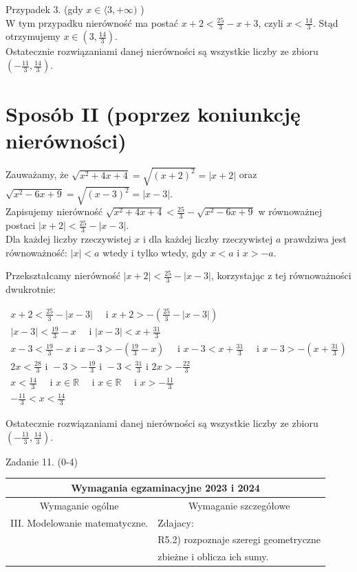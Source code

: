 \documentclass[10pt]{article}
\begin{document}
Przypadek 3. (gdy $x \in\langle 3,+\infty)$ )\\
W tym przypadku nierówność ma postać $x+2<\frac{25}{3}-x+3$, czyli $x<\frac{14}{3}$. Stąd otrzymujemy $x \in\left(3, \frac{14}{3}\right)$.\\
Ostatecznie rozwiązaniami danej nierówności są wszystkie liczby ze zbioru $\left(-\frac{11}{3}, \frac{14}{3}\right)$.

\section*{Sposób II (poprzez koniunkcję nierówności)}
Zauważamy, że $\sqrt{x^{2}+4 x+4}=\sqrt{(x+2)^{2}}=|x+2|$ oraz $\sqrt{x^{2}-6 x+9}=\sqrt{(x-3)^{2}}=|x-3|$.\\
Zapisujemy nierówność $\sqrt{x^{2}+4 x+4}<\frac{25}{3}-\sqrt{x^{2}-6 x+9}$ w równoważnej postaci $|x+2|<\frac{25}{3}-|x-3|$.\\
Dla każdej liczby rzeczywistej $x$ i dla każdej liczby rzeczywistej $a$ prawdziwa jest równoważność: $|x|<a$ wtedy i tylko wtedy, gdy $x<a$ i $x>-a$.

Przekształcamy nierówność $|x+2|<\frac{25}{3}-|x-3|$, korzystając z tej równoważności dwukrotnie:

$$
\begin{gathered}
x+2<\frac{25}{3}-|x-3| \quad \text { i } x+2>-\left(\frac{25}{3}-|x-3|\right) \\
|x-3|<\frac{19}{3}-x \quad \text { i }|x-3|<x+\frac{31}{3} \\
x-3<\frac{19}{3}-x \text { i } x-3>-\left(\frac{19}{3}-x\right) \quad \text { i } x-3<x+\frac{31}{3} \quad \text { i } x-3>-\left(x+\frac{31}{3}\right) \\
2 x<\frac{28}{3} \text { i }-3>-\frac{19}{3} \text { i }-3<\frac{31}{3} \text { i } 2 x>-\frac{22}{3} \\
x<\frac{14}{3} \quad \text { i } x \in \mathbb{R} \quad \text { i } x \in \mathbb{R} \quad \text { i } x>-\frac{11}{3} \\
-\frac{11}{3}<x<\frac{14}{3}
\end{gathered}
$$

Ostatecznie rozwiązaniami danej nierówności są wszystkie liczby ze zbioru $\left(-\frac{11}{3}, \frac{14}{3}\right)$.

Zadanie 11. (0-4)

\begin{center}
\begin{tabular}{|l|l|}
\hline
\multicolumn{2}{|c|}{Wymagania egzaminacyjne 2023 i 2024} \\
\hline
\multicolumn{1}{|c|}{Wymaganie ogólne} & \multicolumn{1}{c|}{Wymaganie szczegółowe} \\
\hline
III. Modelowanie matematyczne. & Zdajacy: \\
 & R5.2) rozpoznaje szeregi geometryczne \\
 & zbieżne i oblicza ich sumy. \\
\hline
\end{tabular}
\end{center}
\end{document}
